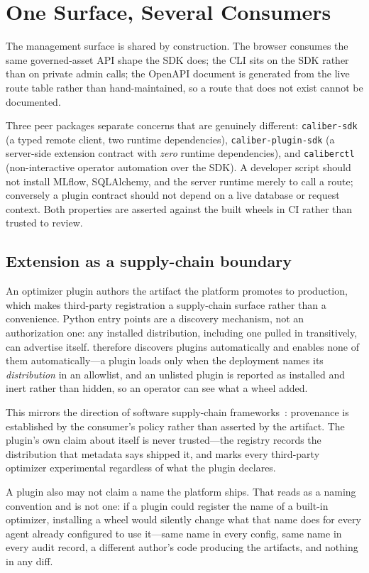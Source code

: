 \documentclass{article}
\newcommand{\code}[1]{\texttt{#1}}
\begin{document}
\section{One Surface, Several Consumers}

The management surface is shared by construction. The browser consumes the same
governed-asset API shape the SDK does; the CLI sits on the SDK rather than on
private admin calls; the OpenAPI document is generated from the live route table
rather than hand-maintained, so a route that does not exist cannot be documented.

Three peer packages separate concerns that are genuinely different:
\code{caliber-sdk} (a typed remote client, two runtime dependencies),
\code{caliber-plugin-sdk} (a server-side extension contract with \emph{zero}
runtime dependencies), and \code{caliberctl} (non-interactive operator automation
over the SDK). A developer script should not install MLflow, SQLAlchemy, and the
server runtime merely to call a route; conversely a plugin contract should not
depend on a live database or request context. Both properties are asserted against
the built wheels in CI rather than trusted to review.

\subsection{Extension as a supply-chain boundary}

An optimizer plugin authors the artifact the platform promotes to production, which
makes third-party registration a supply-chain surface rather than a convenience.
Python entry points are a discovery mechanism, not an authorization one: any
installed distribution, including one pulled in transitively, can advertise itself.
\sys therefore discovers plugins automatically and enables none of them
automatically---a plugin loads only when the deployment names its \emph{distribution}
in an allowlist, and an unlisted plugin is reported as installed and inert rather
than hidden, so an operator can see what a wheel added.

This mirrors the direction of software supply-chain
frameworks~\cite{torresarias2019intoto,slsa}: provenance is established by the
consumer's policy rather than asserted by the artifact. The plugin's own claim
about itself is never trusted---the registry records the distribution that
metadata says shipped it, and marks every third-party optimizer experimental
regardless of what the plugin declares.

A plugin also may not claim a name the platform ships. That reads as a naming
convention and is not one: if a plugin could register the name of a built-in
optimizer, installing a wheel would silently change what that name does for every
agent already configured to use it---same name in every config, same name in every
audit record, a different author's code producing the artifacts, and nothing in any
diff.
\end{document}
